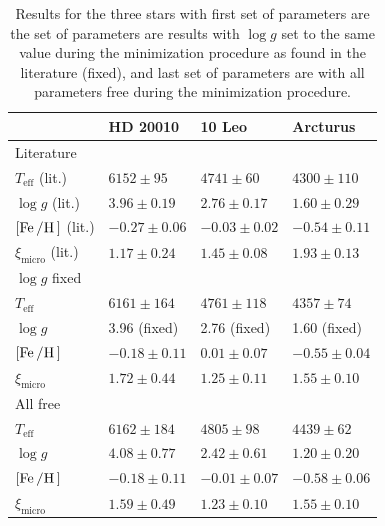 \begin{table}[htb!]
    \caption{Results for the three stars with first set of parameters are the
             set of parameters are results with $\log g$ set to the same value
             during the minimization procedure as found in the literature
             (fixed), and last set of parameters are with all parameters free
             during the minimization procedure.}
    \label{tab:results}
    \centering
    \begin{tabular}{llll}
      \hline\hline
                                    & HD 20010          &  10 Leo           &  Arcturus        \\
      \hline
        Literature                  &                   &                   &                  \\
        $T_\mathrm{eff}$ (lit.)     & $6152 \pm  95$    &  $4741 \pm  60$   & $4300 \pm 110$   \\
        $\log g$ (lit.)             & $3.96 \pm 0.19$   &  $2.76 \pm 0.17$  & $1.60 \pm 0.29$  \\
        $[\ion{Fe}/\ion{H}]$ (lit.) & $-0.27 \pm 0.06$  &  $-0.03 \pm 0.02$ & $-0.54 \pm 0.11$ \\
        $\xi_\mathrm{micro}$ (lit.) & $1.17 \pm 0.24$   &  $1.45 \pm 0.08$  & $1.93 \pm 0.13$  \\
      \hline
        $\log g$ fixed              &                   &                   &                  \\
        $T_\mathrm{eff}$            & $6161 \pm 164$    &  $4761 \pm 118$   & $4357 \pm  74$   \\
        $\log g$                    & 3.96 (fixed)      &  2.76 (fixed)     & 1.60 (fixed)     \\
        $[\ion{Fe}/\ion{H}]$        & $-0.18 \pm 0.11$  &  $ 0.01 \pm 0.07$ & $-0.55 \pm 0.04$ \\
        $\xi_\mathrm{micro}$        & $1.72 \pm 0.44$   &  $1.25 \pm 0.11$  & $1.55 \pm 0.10$  \\
      \hline
        All free                    &                   &                   &                  \\
        $T_\mathrm{eff}$            & $6162 \pm 184$    &  $4805 \pm  98$   & $4439 \pm  62$   \\
        $\log g$                    & $4.08 \pm 0.77$   &  $2.42 \pm 0.61$  & $1.20 \pm 0.20$  \\
        $[\ion{Fe}/\ion{H}]$        & $-0.18 \pm 0.11$  &  $-0.01 \pm 0.07$ & $-0.58 \pm 0.06$ \\
        $\xi_\mathrm{micro}$        & $1.59 \pm 0.49$   &  $1.23 \pm 0.10$  & $1.55 \pm 0.10$  \\
        \hline\hline
    \end{tabular}
\end{table}


